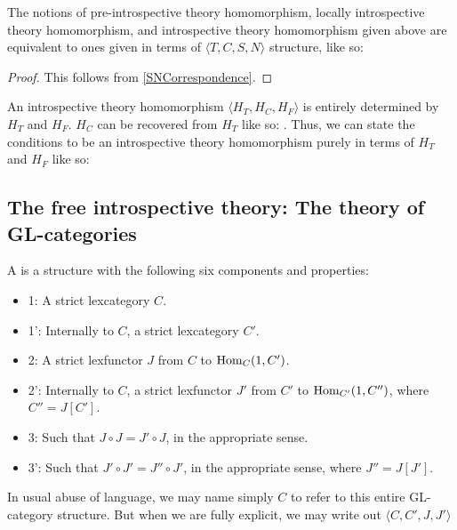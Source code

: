 \begin{theorem}
The notions of pre-introspective theory homomorphism, locally introspective theory homomorphism, and introspective theory homomorphism given above are equivalent to ones given in terms of $\langle T, C, S, N \rangle$ structure, like so: \TODO
\end{theorem}
\begin{proof}
This follows from \cref{SNCorrespondence}.
\end{proof}

\begin{theorem}
An introspective theory homomorphism $\langle H_T, H_C, H_F \rangle$ is entirely determined by $H_T$ and $H_F$. $H_C$ can be recovered from $H_T$ like so: \TODO. Thus, we can state the conditions to be an introspective theory homomorphism purely in terms of $H_T$ and $H_F$ like so: \TODO
\end{theorem}


\subsection{The free introspective theory: The theory of GL-categories}
\begin{definition}
A  is a structure with the following six components and properties:
\begin{itemize}
    \item 1: A strict lexcategory $C$.
    \item 1': Internally to $C$, a strict lexcategory $C'$.
    \item 2: A strict lexfunctor $J$ from $C$ to $\operatorname{Hom}_C(1, C')$.
    \item 2': Internally to $C$, a strict lexfunctor $J'$ from $C'$ to $\operatorname{Hom}_{C'}(1, C'')$, where $C'' = J[C']$.
    \item 3: Such that $J \circ J = J' \circ J$, in the appropriate sense.
    \item 3': Such that $J' \circ J' = J'' \circ J'$, in the appropriate sense, where $J'' = J[J']$.
\end{itemize}
In usual abuse of language, we may name simply $C$ to refer to this entire GL-category structure. But when we are fully explicit, we may write out $\langle C, C', J, J' \rangle$
\end{definition}

